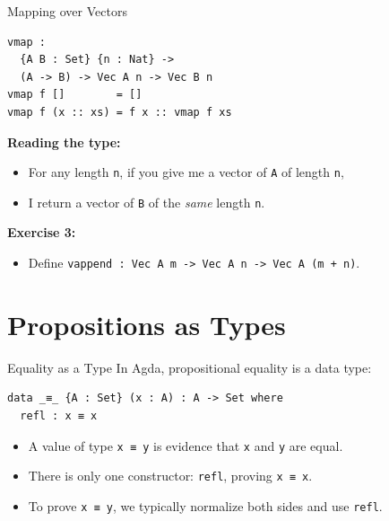 \documentclass[aspectratio=169]{beamer}
\begin{document}
\begin{frame}[fragile]{Mapping over Vectors}
\begin{lstlisting}
vmap :
  {A B : Set} {n : Nat} ->
  (A -> B) -> Vec A n -> Vec B n
vmap f []        = []
vmap f (x :: xs) = f x :: vmap f xs
\end{lstlisting}

  \textbf{Reading the type:}
  \begin{itemize}
    \item For any length \texttt{n}, if you give me a vector of \texttt{A} of length \texttt{n},
    \item I return a vector of \texttt{B} of the \emph{same} length \texttt{n}.
  \end{itemize}

  \vfill
  \textbf{Exercise 3:}
  \begin{itemize}
    \item Define \texttt{vappend : Vec A m -> Vec A n -> Vec A (m + n)}.
  \end{itemize}
\end{frame}

\section{Propositions as Types}

\begin{frame}[fragile]{Equality as a Type}
  In Agda, propositional equality is a data type:

\begin{lstlisting}
data _≡_ {A : Set} (x : A) : A -> Set where
  refl : x ≡ x
\end{lstlisting}

  \begin{itemize}
    \item A value of type \texttt{x ≡ y} is evidence that \texttt{x} and \texttt{y} are equal.
    \item There is only one constructor: \texttt{refl}, proving \texttt{x ≡ x}.
    \item To prove \texttt{x ≡ y}, we typically normalize both sides and use \texttt{refl}.
  \end{itemize}
\end{frame}
\end{document}
